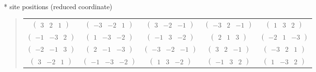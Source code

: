 \documentclass[fleqn,9pt,landscape]{jsarticle}
\begin{document}
* site positions (reduced coordinate)
\begin{quote}
\begin{tabular}{ccccc}
$ \begin{pmatrix} 3 & 2 & 1 \end{pmatrix} $ & $ \begin{pmatrix} -3 & -2 & 1 \end{pmatrix} $ & $ \begin{pmatrix} 3 & -2 & -1 \end{pmatrix} $ & $ \begin{pmatrix} -3 & 2 & -1 \end{pmatrix} $ & $ \begin{pmatrix} 1 & 3 & 2 \end{pmatrix} $ \\
$ \begin{pmatrix} -1 & -3 & 2 \end{pmatrix} $ & $ \begin{pmatrix} 1 & -3 & -2 \end{pmatrix} $ & $ \begin{pmatrix} -1 & 3 & -2 \end{pmatrix} $ & $ \begin{pmatrix} 2 & 1 & 3 \end{pmatrix} $ & $ \begin{pmatrix} -2 & 1 & -3 \end{pmatrix} $ \\
$ \begin{pmatrix} -2 & -1 & 3 \end{pmatrix} $ & $ \begin{pmatrix} 2 & -1 & -3 \end{pmatrix} $ & $ \begin{pmatrix} -3 & -2 & -1 \end{pmatrix} $ & $ \begin{pmatrix} 3 & 2 & -1 \end{pmatrix} $ & $ \begin{pmatrix} -3 & 2 & 1 \end{pmatrix} $ \\
$ \begin{pmatrix} 3 & -2 & 1 \end{pmatrix} $ & $ \begin{pmatrix} -1 & -3 & -2 \end{pmatrix} $ & $ \begin{pmatrix} 1 & 3 & -2 \end{pmatrix} $ & $ \begin{pmatrix} -1 & 3 & 2 \end{pmatrix} $ & $ \begin{pmatrix} 1 & -3 & 2 \end{pmatrix} $ \\

\end{tabular}
\end{quote}
\end{document}
